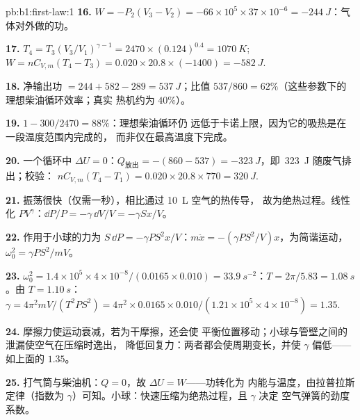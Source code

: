 \begin{solution}{pb:b1:first-law:1}
\textbf{16.} $W = -P_2(V_3 - V_2) = -66\times10^5 \times 37\times10^{-6} =
\qty{-244}{J}$：气体对外做的功。

\textbf{17.} $T_4 = T_3(V_3/V_1)^{\gamma - 1} = 2470 \times (0.124)^{0.4} =
\qty{1070}{K}$; $W = nC_{V,m}(T_4 - T_3) = 0.020 \times 20.8 \times (-1400) =
\qty{-582}{J}$.

\textbf{18.} 净输出功 $= 244 + 582 - 289 = \qty{537}{J}$；比值
$537/860 = 62\%$（这些参数下的理想柴油循环效率；真实
热机约为 $40\%$）。

\textbf{19.} $1 - 300/2470 = 88\%$：理想柴油循环仍
远低于卡诺上限，因为它的吸热是在一段温度范围内完成的，
而非仅在最高温度下完成。

\textbf{20.} 一个循环中 $\Delta U = 0$：$Q_{\text{放出}} = -(860 - 537) =
\qty{-323}{J}$，即\ \qty{323}{J} 随废气排出；校验：
$nC_{V,m}(T_4 - T_1) = 0.020 \times 20.8 \times 770 = \qty{320}{J}$.

\textbf{21.} 振荡很快（仅需一秒），相比通过 \qty{10}{L} 空气的热传导，
故为绝热过程。线性化
$PV^\gamma$：$\dd P/P = -\gamma\,\dd V/V = -\gamma Sx/V$。

\textbf{22.} 作用于小球的力为 $S\,\dd P = -\gamma PS^2x/V$：$m\ddot x =
-(\gamma PS^2/V)x$，为简谐运动，$\omega_0^2 = \gamma PS^2/mV$。

\textbf{23.} $\omega_0^2 = 1.4 \times 10^5 \times 4\times10^{-8}/(0.0165 \times 0.010)
= \qty{33.9}{s^{-2}}$：$T = 2\pi/5.83 = \qty{1.08}{s}$。由 $T = \qty{1.10}{s}$：
$\gamma = 4\pi^2mV/(T^2PS^2) = 4\pi^2 \times 0.0165 \times 0.010/(1.21 \times 10^5
\times 4\times10^{-8}) = 1.35$.

\textbf{24.} 摩擦力使运动衰减，若为干摩擦，还会使
平衡位置移动；小球与管壁之间的泄漏使空气在压缩时逸出，
降低回复力：两者都会使周期变长，并使
$\gamma$ 偏低——如上面的 $1.35$。

\textbf{25.} 打气筒与柴油机：$Q = 0$，故 $\Delta U = W$——功转化为
内能与温度，由拉普拉斯定律（指数为
$\gamma$）可知。小球：快速压缩为绝热过程，且 $\gamma$ 决定
空气弹簧的劲度系数。
\end{solution}
